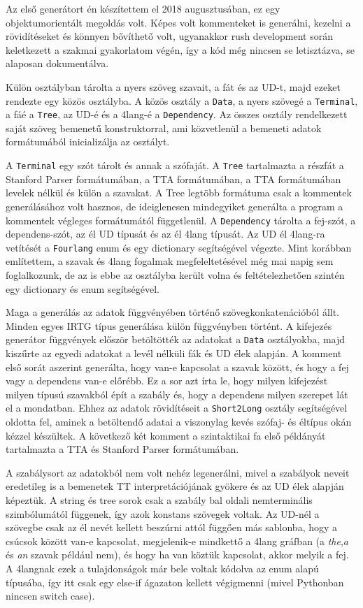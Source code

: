Az első generátort én készítettem el 2018 augusztusában, ez egy objektumorientált megoldás volt. 
Képes volt kommenteket is generálni, kezelni a rövidítéseket és könnyen bővíthető volt, ugyanakkor rush development során keletkezett a szakmai gyakorlatom végén, így a kód még nincsen se letisztázva, se alaposan dokumentálva.

Külön osztályban tárolta a nyers szöveg szavait, a fát és az UD-t, majd ezeket rendezte egy közös osztályba. 
A közös osztály a \texttt{Data}, a nyers szövegé a \texttt{Terminal}, a fáé a \texttt{Tree}, az UD-é és a 4lang-é a \texttt{Dependency}. 
Az összes osztály rendelkezett saját szöveg bemenetű konstruktorral, ami közvetlenül a bemeneti adatok formátumából inicializálja az osztályt.

A \texttt{Terminal} egy szót tárolt és annak a szófaját. 
A \texttt{Tree} tartalmazta a részfát a Stanford Parser formátumában, a TTA formátumában, a TTA formátumában levelek nélkül és külön a szavakat. 
A Tree legtöbb formátuma csak a kommentek generálásához volt hasznos, de ideiglenesen mindegyiket generálta a program a kommentek végleges formátumától függetlenül. 
A \texttt{Dependency} tárolta a fej-szót, a dependens-szót, az él UD típusát és az él 4lang típusát. 
Az UD él 4lang-ra vetítését a \texttt{Fourlang} enum és egy dictionary segítségével végezte. 
Mint korábban említettem, a szavak és 4lang fogalmak megfeleltetésével még mai napig sem foglalkozunk, de az is ebbe az osztályba került volna és feltételezhetően szintén egy dictionary és enum segítségével.

Maga a generálás az adatok függvényében történő szövegkonkatenációból állt.
Minden egyes IRTG típus generálása külön függvényben történt.
A kifejezés generátor függvények először betöltötték az adatokat a \texttt{Data} osztályokba, majd kiszűrte az egyedi adatokat a levél nélküli fák és UD élek alapján. 
A komment első sorát aszerint generálta, hogy van-e kapcsolat a szavak között, és hogy a fej vagy a dependens van-e előrébb. 
Ez a sor azt írta le, hogy milyen kifejezést milyen típusú szavakból épít a szabály és, hogy a dependens milyen szerepet lát el a mondatban. 
Ehhez az adatok rövidítéseit a \texttt{Short2Long} osztály segítségével oldotta fel, aminek a betöltendő adatai  a viszonylag kevés szófaj- és éltípus okán kézzel készültek. 
A következő két komment a szintaktikai fa első példányát tartalmazta a TTA és Stanford Parser formátumában. 

A szabálysort az adatokból nem volt nehéz legenerálni, mivel a szabályok neveit eredetileg is a bemenetek TT interpretációjának gyökere és az UD élek alapján képeztük. 
A string és tree sorok csak a szabály bal oldali nemterminális szimbólumától függenek, így azok konstans szövegek voltak. 
Az UD-nél a szövegbe csak az él nevét kellett beszúrni attól függően más sablonba, hogy a csúcsok között van-e kapcsolat, megjelenik-e mindkettő a 4lang gráfban (a \textit{the},\textit{a} és \textit{an} szavak például nem), és hogy ha van köztük kapcsolat, akkor melyik a fej. 
A 4langnak ezek a tulajdonságok már bele voltak kódolva az enum alapú típusába, így itt csak egy else-if ágazaton kellett végigmenni (mivel Pythonban nincsen switch case).

